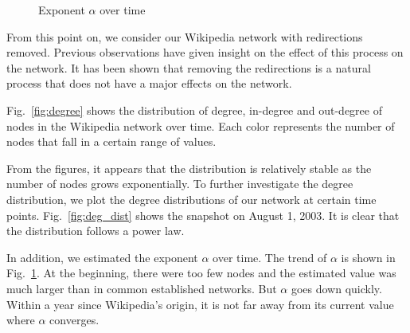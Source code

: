 \documentclass[10pt,twocolumn]{article}
\begin{document}
\begin{figure}[ht]
\caption{Exponent $\alpha$ over time}
\label{fig:alpha_trend}
\end{figure}

From this point on, we consider our Wikipedia network with redirections removed. Previous observations have given insight on the effect of this process on the network. It has been shown that removing the redirections is a natural process that does not have a major effects on the network.

Fig.~\ref{fig:degree} shows the distribution of degree, in-degree and out-degree of nodes in the Wikipedia network over time. Each color represents the number of nodes that fall in a certain range of values. 

From the figures, it appears that the distribution is relatively stable as the number of nodes grows exponentially. To further investigate the degree distribution, we plot the degree distributions of our network at certain time points. Fig.~\ref{fig:deg_dist} shows the snapshot on August 1, 2003. It is clear that the distribution follows a power law. 

In addition, we estimated the exponent $\alpha$ over time. The trend of $\alpha$ is shown in Fig.~\ref{fig:alpha_trend}. At the beginning, there were too few nodes and the estimated value was much larger than in common established networks. But $\alpha$ goes down quickly. Within a year since Wikipedia's origin, it is not far away from its current value where $\alpha$ converges.
\end{document}
